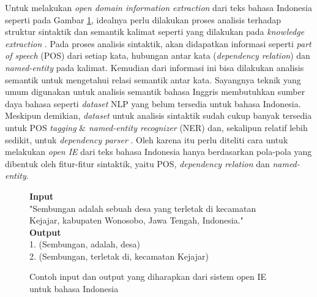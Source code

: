 Untuk melakukan \textit{open domain information extraction} dari teks bahasa Indonesia seperti pada Gambar \ref{fig:example_io_openie}, idealnya perlu dilakukan proses analisis terhadap struktur sintaktik dan semantik kalimat seperti yang dilakukan pada \textit{knowledge extraction} \citep{exner2014refractive}. Pada proses analisis sintaktik, akan didapatkan informasi seperti \textit{part of speech} (POS) dari setiap kata, hubungan antar kata (\textit{dependency relation}) dan \textit{named-entity} pada kalimat. Kemudian dari informasi ini bisa dilakukan analisis semantik untuk mengetahui relasi semantik antar kata. Sayangnya teknik yang umum digunakan untuk analisis semantik bahasa Inggris membutuhkan sumber daya bahasa seperti \textit{dataset} NLP yang belum tersedia untuk bahasa Indonesia. Meskipun demikian, \textit{dataset}  untuk analisis sintaktik sudah cukup banyak tersedia untuk POS \textit{tagging} \citep{wicaksono2010hmm} \& \textit{named-entity recognizer} (NER) \citep{fader2011identifying} dan, sekalipun relatif lebih sedikit, untuk \textit{dependency parser} \citep{nivre2016universal}. Oleh karena itu perlu diteliti cara untuk melakukan \textit{open IE} dari teks bahasa Indonesia hanya berdasarkan pola-pola yang dibentuk oleh fitur-fitur sintaktik, yaitu POS, \textit{dependency relation} dan \textit{named-entity}. 

\begin{figure}
	\begin{mdframed}
		\textbf{Input} \\
		"Sembungan adalah sebuah desa yang terletak di kecamatan Kejajar, kabupaten Wonosobo, Jawa Tengah, Indonesia." \\
		
		\textbf{Output} \\
		1. (Sembungan, adalah, desa) \\
		2. (Sembungan, terletak di, kecamatan Kejajar)
	\end{mdframed}
	\caption{Contoh input dan output yang diharapkan dari sistem open IE untuk bahasa Indonesia}
	\label{fig:example_io_openie}
\end{figure}

